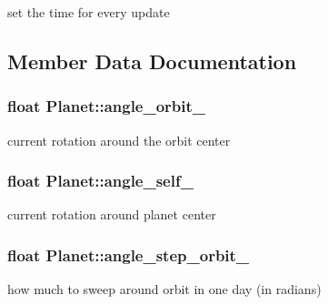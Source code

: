 set the time for every update 



\subsection{Member Data Documentation}
\subsubsection[{\texorpdfstring{angle\+\_\+orbit\+\_\+}{angle_orbit_}}]{\setlength{\rightskip}{0pt plus 5cm}float Planet\+::angle\+\_\+orbit\+\_\+}\hypertarget{classPlanet_a674db34348bebd17133630806b8a4523}{}\label{classPlanet_a674db34348bebd17133630806b8a4523}


current rotation around the orbit center 

\subsubsection[{\texorpdfstring{angle\+\_\+self\+\_\+}{angle_self_}}]{\setlength{\rightskip}{0pt plus 5cm}float Planet\+::angle\+\_\+self\+\_\+}\hypertarget{classPlanet_abb864fb6e4e677f72d1c3b5622a524af}{}\label{classPlanet_abb864fb6e4e677f72d1c3b5622a524af}


current rotation around planet center 

\subsubsection[{\texorpdfstring{angle\+\_\+step\+\_\+orbit\+\_\+}{angle_step_orbit_}}]{\setlength{\rightskip}{0pt plus 5cm}float Planet\+::angle\+\_\+step\+\_\+orbit\+\_\+}\hypertarget{classPlanet_a91e8faddde8308f4037f4d4cd84e4da3}{}\label{classPlanet_a91e8faddde8308f4037f4d4cd84e4da3}


how much to sweep around orbit in one day (in radians) 

